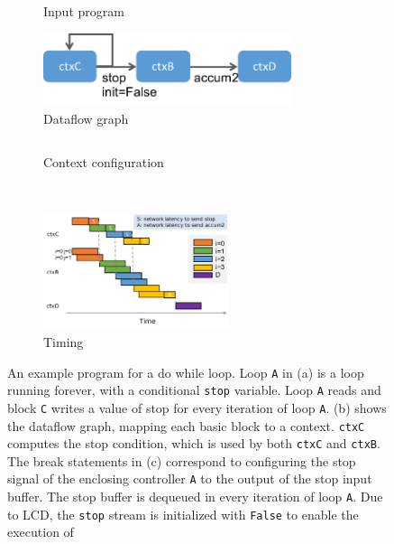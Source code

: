 \begin{figure}
\centering
  \vspace{-1cm}
\begin{subfigure}[b]{0.45\textwidth}
\inputminted{python}{code/dowhile.py}
\caption{Input program}
  \vspace{0.2cm}
\includegraphics[width=0.8\textwidth]{figs/dowhile.pdf}
\caption{Dataflow graph}
\end{subfigure}
\hfill
\begin{subfigure}[b]{0.48\textwidth}
\inputminted{python}{code/dowhilectx.py}
\caption{Context configuration}
\end{subfigure}
\\
  \vspace{0.2cm}
\begin{subfigure}[b]{\textwidth}
  \centering
\includegraphics[width=0.6\textwidth]{figs/dowhiletiming.pdf}
\caption{Timing}
\end{subfigure}
\caption[Do-while loop example]{
  An example program for a do while loop. 
  Loop \texttt{A} in (a) is a loop running forever, with a conditional \texttt{stop} variable.
Loop \texttt{A} reads and block \texttt{C} writes a value of stop for every iteration of loop
\texttt{A}.
 (b) shows the dataflow graph, mapping each basic block to a context.
\texttt{ctxC} computes the stop condition, which is used by both \texttt{ctxC} and \texttt{ctxB}.
  The break statements in (c) correspond to configuring the stop signal of the enclosing controller \texttt{A}
  to the output of the stop input buffer. The stop buffer is dequeued in every iteration of loop \texttt{A}.
  Due to LCD,  the \texttt{stop} stream is initialized with \texttt{False} to enable the execution of
}
\end{figure}
